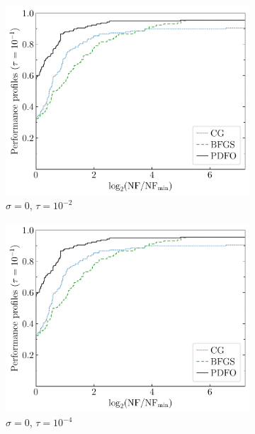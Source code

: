 \documentclass[
    smallextended,  %
    final,          %
]{svjour3}
\begin{document}
\begin{figure}[htbp]
    \begin{subfigure}{.48\textwidth}
        \centering
        \includegraphics[width=\textwidth,page=2]{perf-plain-bfgs_cg_pdfo-50.pdf}
        \caption{$\sigma = 0$, $\tau = 10^{-2}$}
    \end{subfigure}
    \hfill
    \begin{subfigure}{.48\textwidth}
        \centering
        \includegraphics[width=\textwidth,page=4]{perf-plain-bfgs_cg_pdfo-50.pdf}
        \caption{$\sigma = 0$, $\tau = 10^{-4}$}
    \end{subfigure}
    \hfill
    \begin{subfigure}{.48\textwidth}

\end{subfigure}
\end{figure}
\end{document}
